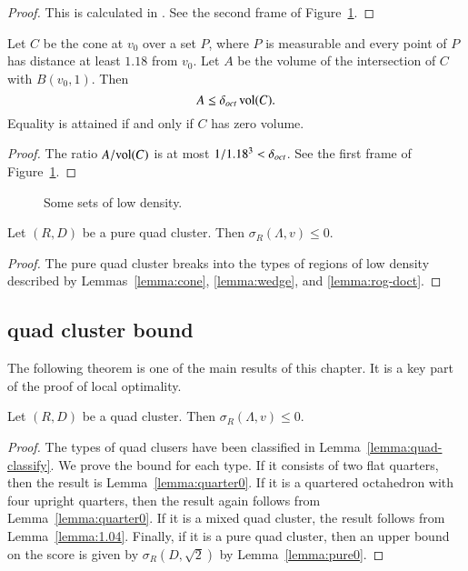 \begin{proof} This is calculated in \cite[Sec. 4]{part2}.  See the
second frame of Figure~\ref{fig:doct}.
\end{proof}

\begin{lemma} \label{lemma:cone}
Let $C$ be the cone at $v_0$ over a set $P$, where $P$ is
measurable and every point of $P$ has distance at least $1.18$
from $v_0$.  Let $A$ be the volume of the intersection of $C$
with $B(v_0,1)$. Then
    $$A\le\delta_{oct}\,{\operatorname{vol}}(C).$$
Equality is attained if and only if $C$ has zero volume.
\end{lemma}

\begin{proof} The ratio $A/{\operatorname{vol}}(C)$ is at most $1/1.18^3 < \delta_{oct}$.   See the
first frame of Figure~\ref{fig:doct}.
\end{proof}

\begin{figure}[htb]
  \centering
  \caption{Some sets of low density.}
  \label{fig:doct}
\end{figure}

\begin{lemma}\label{lemma:pure0}
Let $(R,D)$ be a pure quad cluster.  Then
  $\sigma_R(\Lambda,v)\le 0$.
\end{lemma}

\begin{proof}  The pure quad cluster breaks into the types
of regions of low density described by Lemmas~\ref{lemma:cone},
\ref{lemma:wedge}, and \ref{lemma:rog-doct}.
\end{proof}




\subsection{quad cluster bound}



The following theorem is one of the main results of this
chapter. It is a key part of the proof of local optimality.


\begin{theorem}\label{lemma:quad0} Let $(R,D)$ be a quad cluster.
Then $\sigma_R(\Lambda,v)\le 0$.
\end{theorem}

\begin{proof}
The types of quad clusers have been classified in Lemma~\ref{lemma:quad-classify}.
We prove the bound for each type.
If it consists of two flat quarters, then the result is
Lemma~\ref{lemma:quarter0}.  If it is a quartered octahedron with
four upright quarters, then the result again follows from
Lemma~\ref{lemma:quarter0}.  If it is a mixed quad cluster,
the result follows from Lemma~\ref{lemma:1.04}.  Finally,
if it is a pure quad cluster, then an upper bound on the score
is given by $\sigma_R(D,\sqrt2)$ by Lemma~\ref{lemma:pure0}.  
\end{proof}







